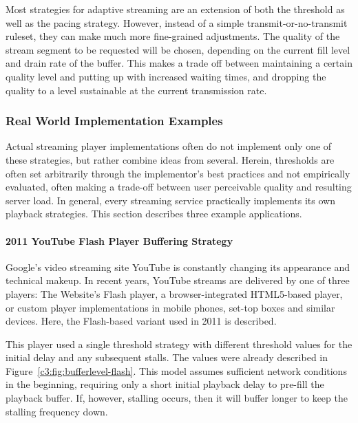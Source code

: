 Most strategies for adaptive streaming are an extension of both the threshold as well as the pacing strategy. However, instead of a simple transmit-or-no-transmit ruleset, they can make much more fine-grained adjustments. The quality of the stream segment to be requested will be chosen, depending on the current fill level and drain rate of the buffer. This makes a trade off between maintaining a certain quality level and putting up with increased waiting times, and dropping the quality to a level sustainable at the current transmission rate.


\subsubsection{Real World Implementation Examples}

Actual streaming player implementations often do not implement only one of these strategies, but rather combine ideas from several. Herein, thresholds are often set arbitrarily through the implementor's best practices and not empirically evaluated, often making a trade-off between user perceivable quality and resulting server load. In general, every streaming service practically implements its own playback strategies. This section describes three example applications.

\paragraph{2011 YouTube Flash Player Buffering Strategy}

Google's video streaming site YouTube is constantly changing its appearance and technical makeup. In recent years, YouTube streams are delivered by one of three players: The Website's Flash player, a browser-integrated HTML5-based player, or custom player implementations in mobile phones, set-top boxes and similar devices. Here, the Flash-based variant used in 2011 is described.

This player used a single threshold strategy with different threshold values for the initial delay and any subsequent stalls. The values were already described in Figure~\ref{c3:fig:bufferlevel-flash}. This model assumes sufficient network conditions in the beginning, requiring only a short initial playback delay to pre-fill the playback buffer. If, however, stalling occurs, then it will buffer longer to keep the stalling frequency down.

